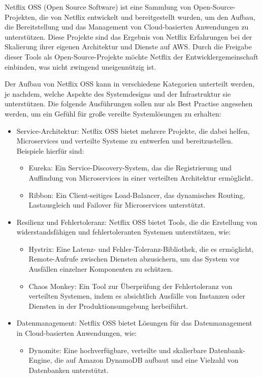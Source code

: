 Netflix OSS (Open Source Software) ist eine Sammlung von Open-Source-Projekten, die von Netflix entwickelt und bereitgestellt wurden, um den Aufbau, die Bereitstellung und das Management von Cloud-basierten Anwendungen zu unterstützen. Diese Projekte sind das Ergebnis von Netflix Erfahrungen bei der Skalierung ihrer eigenen Architektur und Dienste auf AWS. Durch die Freigabe dieser Tools als Open-Source-Projekte möchte Netflix der Entwicklergemeinschaft einbinden, was nicht zwingend uneigennützig ist.

Der Aufbau von Netflix OSS kann in verschiedene Kategorien unterteilt werden, je nachdem, welche Aspekte des Systemdesigns und der Infrastruktur sie unterstützen. Die folgende Ausführungen sollen nur als Best Practise angesehen werden, um ein Gefühl für große vereilte Systemlösungen zu erhalten:
\begin{itemize}
\item Service-Architektur: Netflix OSS bietet mehrere Projekte, die dabei helfen, Microservices und verteilte Systeme zu entwerfen und bereitzustellen. Beispiele hierfür sind:
\begin{itemize}
\item Eureka: Ein Service-Discovery-System, das die Registrierung und Auffindung von Microservices in einer verteilten Architektur ermöglicht.
\item Ribbon: Ein Client-seitiges Load-Balancer, das dynamisches Routing, Lastausgleich und Failover für Microservices unterstützt.
\end{itemize}
\item Resilienz und Fehlertoleranz: Netflix OSS bietet Tools, die die Erstellung von widerstandsfähigen und fehlertoleranten Systemen unterstützen, wie:
\begin{itemize}
\item Hystrix: Eine Latenz- und Fehler-Toleranz-Bibliothek, die es ermöglicht, Remote-Aufrufe zwischen Diensten abzusichern, um das System vor Ausfällen einzelner Komponenten zu schützen.
\item Chaos Monkey: Ein Tool zur Überprüfung der Fehlertoleranz von verteilten Systemen, indem es absichtlich Ausfälle von Instanzen oder Diensten in der Produktionsumgebung herbeiführt.
\end{itemize}
\item Datenmanagement: Netflix OSS bietet Lösungen für das Datenmanagement in Cloud-basierten Anwendungen, wie:
\begin{itemize}
\item Dynomite: Eine hochverfügbare, verteilte und skalierbare Datenbank-Engine, die auf Amazon DynamoDB aufbaut und eine Vielzahl von Datenbanken unterstützt.

\end{itemize}
\end{itemize}
